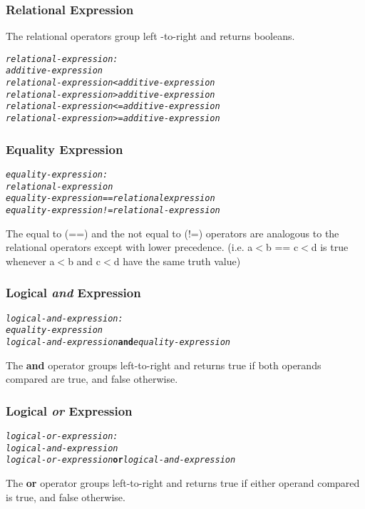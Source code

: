 \documentclass[12pt]{report}
\begin{document}
\subsubsection{Relational Expression}

The relational operators group left -to-right and returns booleans.
\begin{alltt}
         \textit{relational-expression:}
              \textit{additive-expression}
              \textit{relational-expression < additive-expression}
              \textit{relational-expression > additive-expression}
              \textit{relational-expression <= additive-expression}
              \textit{relational-expression >= additive-expression}
\end{alltt}

\subsubsection{Equality Expression}
\begin{alltt}
         \textit{equality-expression:}
              \textit{relational-expression}
              \textit{equality-expression == relational expression}
              \textit{equality-expression != relational-expression}
\end{alltt}
\begin{doublespace}
The equal to (==) and the not equal to (!=) operators are analogous to the relational operators except with lower precedence. (i.e. a$<$b == c$<$d is true whenever a$<$b and c$<$d have the same truth value)
\end{doublespace}

\subsubsection{Logical \textit{and} Expression}
\begin{alltt}
         \textit{logical-and-expression:}
              \textit{equality-expression}
              \textit{logical-and-expression} \textbf{and} \textit{equality-expression}
\end{alltt}
\begin{doublespace}
The \textbf{and} operator groups left-to-right and returns true if both operands compared are true, and false otherwise.
\end{doublespace}

\subsubsection{Logical \textit{or} Expression}
\begin{alltt}
         \textit{logical-or-expression:}
              \textit{logical-and-expression}
              \textit{logical-or-expression} \textbf{or} \textit{logical-and-expression}
\end{alltt}
\begin{doublespace}
The \textbf{or} operator groups left-to-right and returns true if either operand compared is true, and false otherwise.
\end{doublespace}
\end{document}
